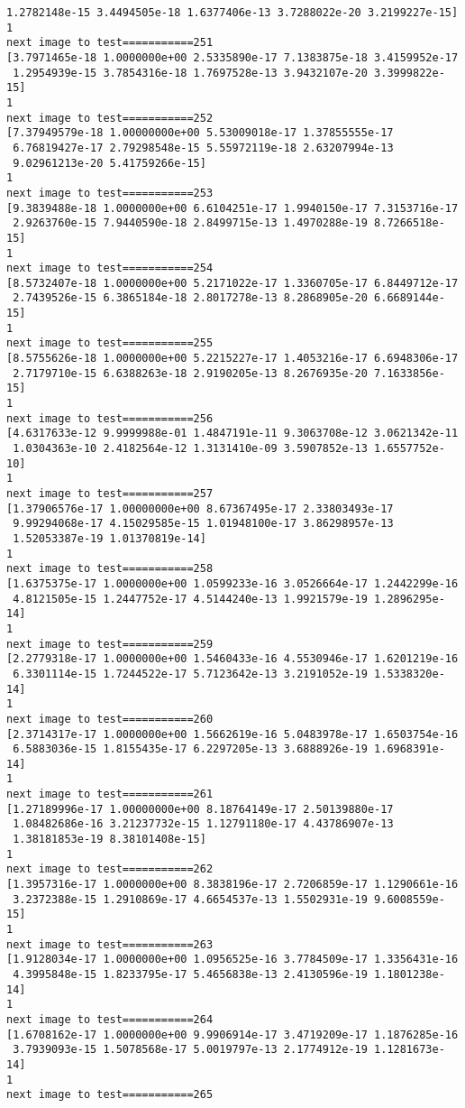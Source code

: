 \documentclass[11pt]{article}
\begin{document}
\begin{Verbatim}[commandchars=\\\{\}]
 1.2782148e-15 3.4494505e-18 1.6377406e-13 3.7288022e-20 3.2199227e-15]
1
next image to test===========251
[3.7971465e-18 1.0000000e+00 2.5335890e-17 7.1383875e-18 3.4159952e-17
 1.2954939e-15 3.7854316e-18 1.7697528e-13 3.9432107e-20 3.3999822e-15]
1
next image to test===========252
[7.37949579e-18 1.00000000e+00 5.53009018e-17 1.37855555e-17
 6.76819427e-17 2.79298548e-15 5.55972119e-18 2.63207994e-13
 9.02961213e-20 5.41759266e-15]
1
next image to test===========253
[9.3839488e-18 1.0000000e+00 6.6104251e-17 1.9940150e-17 7.3153716e-17
 2.9263760e-15 7.9440590e-18 2.8499715e-13 1.4970288e-19 8.7266518e-15]
1
next image to test===========254
[8.5732407e-18 1.0000000e+00 5.2171022e-17 1.3360705e-17 6.8449712e-17
 2.7439526e-15 6.3865184e-18 2.8017278e-13 8.2868905e-20 6.6689144e-15]
1
next image to test===========255
[8.5755626e-18 1.0000000e+00 5.2215227e-17 1.4053216e-17 6.6948306e-17
 2.7179710e-15 6.6388263e-18 2.9190205e-13 8.2676935e-20 7.1633856e-15]
1
next image to test===========256
[4.6317633e-12 9.9999988e-01 1.4847191e-11 9.3063708e-12 3.0621342e-11
 1.0304363e-10 2.4182564e-12 1.3131410e-09 3.5907852e-13 1.6557752e-10]
1
next image to test===========257
[1.37906576e-17 1.00000000e+00 8.67367495e-17 2.33803493e-17
 9.99294068e-17 4.15029585e-15 1.01948100e-17 3.86298957e-13
 1.52053387e-19 1.01370819e-14]
1
next image to test===========258
[1.6375375e-17 1.0000000e+00 1.0599233e-16 3.0526664e-17 1.2442299e-16
 4.8121505e-15 1.2447752e-17 4.5144240e-13 1.9921579e-19 1.2896295e-14]
1
next image to test===========259
[2.2779318e-17 1.0000000e+00 1.5460433e-16 4.5530946e-17 1.6201219e-16
 6.3301114e-15 1.7244522e-17 5.7123642e-13 3.2191052e-19 1.5338320e-14]
1
next image to test===========260
[2.3714317e-17 1.0000000e+00 1.5662619e-16 5.0483978e-17 1.6503754e-16
 6.5883036e-15 1.8155435e-17 6.2297205e-13 3.6888926e-19 1.6968391e-14]
1
next image to test===========261
[1.27189996e-17 1.00000000e+00 8.18764149e-17 2.50139880e-17
 1.08482686e-16 3.21237732e-15 1.12791180e-17 4.43786907e-13
 1.38181853e-19 8.38101408e-15]
1
next image to test===========262
[1.3957316e-17 1.0000000e+00 8.3838196e-17 2.7206859e-17 1.1290661e-16
 3.2372388e-15 1.2910869e-17 4.6654537e-13 1.5502931e-19 9.6008559e-15]
1
next image to test===========263
[1.9128034e-17 1.0000000e+00 1.0956525e-16 3.7784509e-17 1.3356431e-16
 4.3995848e-15 1.8233795e-17 5.4656838e-13 2.4130596e-19 1.1801238e-14]
1
next image to test===========264
[1.6708162e-17 1.0000000e+00 9.9906914e-17 3.4719209e-17 1.1876285e-16
 3.7939093e-15 1.5078568e-17 5.0019797e-13 2.1774912e-19 1.1281673e-14]
1
next image to test===========265

\end{Verbatim}
\end{document}
